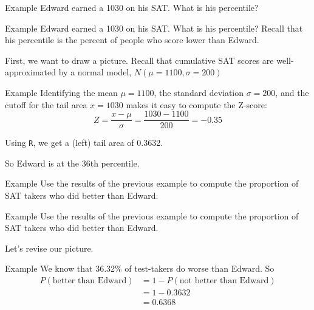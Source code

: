 \begin{frame}{Example}
    Edward earned a 1030 on his SAT. What is his percentile?
\end{frame}

\begin{frame}{Example}
    Edward earned a 1030 on his SAT. What is his percentile? Recall that his percentile is the percent of people who score lower than Edward.
    
    \vspace{12pt}First, we want to draw a picture. Recall that cumulative SAT scores are well-approximated by a normal model, $N (\mu = 1100, \sigma = 200)$
\end{frame}

\begin{frame}{Example}
    Identifying the mean $\mu = 1100$, the standard deviation $\sigma = 200$, and the cutoff for the tail area $x = 1030$ makes it easy to compute the Z-score:
    \[
        Z = \frac{x-\mu}{\sigma} = \frac{1030-1100}{200}=-0.35
    \]
    
    \vspace{12pt}Using \texttt{R}, we get a (left) tail area of 0.3632.
    
    \vspace{12pt}So Edward is at the 36th percentile.
\end{frame}

\begin{frame}{Example}
    Use the results of the previous example to compute the proportion of SAT takers who did better than Edward.
\end{frame}

\begin{frame}{Example}
    Use the results of the previous example to compute the proportion of SAT takers who did better than Edward.
    
    \vspace{12pt}Let's revise our picture.
\end{frame}

\begin{frame}{Example}
    We know that 36.32\% of test-takers do worse than Edward. So
    \begin{align*}
        P(\text{better than Edward}) &= 1-P(\text{not better than Edward}) \\
            &= 1-0.3632 \\
            &= 0.6368
    \end{align*}
\end{frame}

